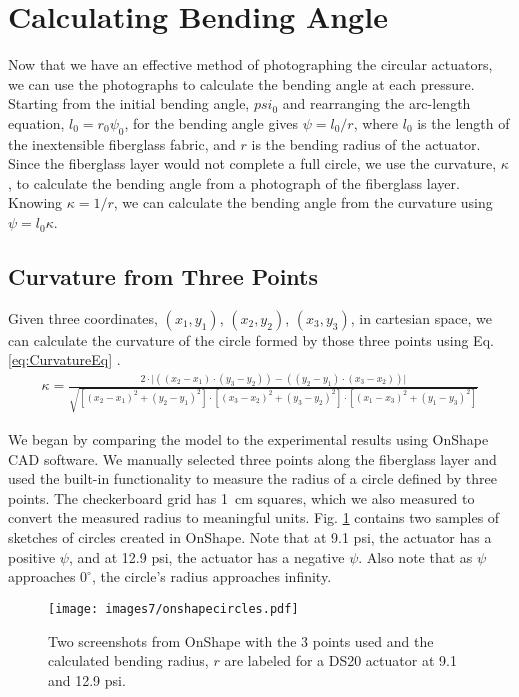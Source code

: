 \section{Calculating Bending Angle}

Now that we have an effective method of photographing the circular actuators, we can use the photographs to calculate the bending angle at each pressure. Starting from the initial bending angle, $psi_0$ and rearranging the arc-length equation, $l_{0} = r_{0}\psi_{0}$, for the bending angle gives $\psi = l_0/r$, where $l_0$ is the length of the inextensible fiberglass fabric, and $r$ is the bending radius of the actuator. Since the fiberglass layer would not complete a full circle, we use the curvature, $\kappa$, to calculate the bending angle from a photograph of the fiberglass layer. Knowing $\kappa = 1/r$, we can calculate the bending angle from the curvature using $\psi = l_{0}\kappa$. 

\subsection{Curvature from Three Points}

Given three coordinates, $(x_1,y_1)$, $(x_2,y_2)$, $(x_3,y_3)$, in cartesian space, we can calculate the curvature of the circle formed by those three points using Eq. \ref{eq:CurvatureEq} \cite{ratliff_cartesian_2019}. 
\begin{align} 
    \kappa = \frac{2\cdot\lvert((x_2-x_1)\cdot(y_3-y_2)) - ((y_2-y_1)\cdot(x_3-x_2))\rvert}{\sqrt{[(x_2-x_1)^2+(y_2-y_1)^2] \cdot [(x_3-x_2)^2+(y_3-y_2)^2] \cdot [(x_1-x_3)^2+(y_1-y_3)^2]}} 
    \label{eq:CurvatureEq} 
\end{align}

We began by comparing the model to the experimental results using OnShape CAD software. We manually selected three points along the fiberglass layer and used the built-in functionality to measure the radius of a circle defined by three points. The checkerboard grid has 1~cm squares, which we also measured to convert the measured radius to meaningful units. Fig. \ref{fig:onshapecircles} contains two samples of sketches of circles created in OnShape. Note that at 9.1 psi, the actuator has a positive $\psi$, and at 12.9 psi, the actuator has a negative $\psi$. Also note that as $\psi$ approaches $0^\circ$, the circle's radius approaches infinity. 

\begin{figure}[ht]
    \centering
     \texttt{[image: images7/onshapecircles.pdf]}
    \caption{Two screenshots from OnShape with the 3 points used and the calculated bending radius, $r$ are labeled for a DS20 actuator at 9.1 and 12.9 psi.}
    \label{fig:onshapecircles}
\end{figure}

